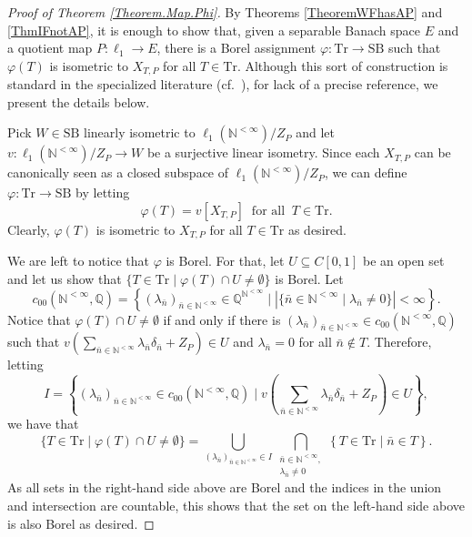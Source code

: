 \documentclass[letterpaper]{amsart}
\numberwithin{equation}{section}
\theoremstyle{definition}
\newcommand{\N}{{\mathbb{N}}}
\newcommand{\Q}{{\mathbb{Q}}}
\newcommand{\Tr}{\mathrm{Tr}}
\newcommand{\SB}{\mathrm{SB}}
\begin{document}
\begin{proof}
[Proof of Theorem \ref{Theorem.Map.Phi}]  By Theorems \ref{TheoremWFhasAP} and \ref{ThmIFnotAP}, it is enough to show that, given a separable Banach space  $E$ and a quotient map $P\colon \ell_1\to E$, there is a Borel assignment $\varphi\colon \Tr\to \SB$ such that $\varphi(T)$ is isometric to $X_{T,P}$ for all $T\in \Tr$. Although this sort of construction is standard in the specialized literature (cf.\ \cite[Lemma 2.4]{Bossard2002Fund}), for lack of a precise reference, we present the details below. 


Pick $W\in \SB$  linearly isometric to $\ell_1(\N^{<\infty})/Z_P$ and let $v\colon \ell_1(\N^{<\infty})/Z_P\to W$ be a surjective linear isometry. Since each $X_{T,P}$ can be canonically seen as a closed subspace of $\ell_1(\N^{<\infty})/Z_P$, we can define   $\varphi\colon \Tr\to \SB$ by letting  \[\varphi(T)=v\left[X_{T,P}\right] \ \text{ for all }\ T\in \Tr.\]
Clearly, $\varphi(T)$ is isometric to $X_{T,P}$ for all $T\in \Tr$ as desired. 

We are left to notice that $\varphi$ is Borel. For that, let $U\subseteq C[0,1]$ be an open set and let us show that 
$\{T\in \Tr\mid \varphi(T)\cap U\neq \emptyset\}$
is Borel. Let 
\[c_{00}(\N^{<\infty},\Q)=\left\{(\lambda_{\bar n})_{\bar n\in \N^{<\infty}}\in \Q^{\N^{<\infty}}\mid |\{\bar n\in \N^{<\infty}\mid \lambda_{\bar n}\neq 0\}|<\infty\right\}.\]
Notice that $\varphi(T)\cap U\neq \emptyset$ if and only if there is $(\lambda_{\bar n})_{\bar n\in \N^{<\infty}} \in c_{00}(\N^{<\infty},\Q)$ such that  $v(\sum_{\bar n\in \N^{<\infty}} \lambda_{\bar n}\delta_{\bar n}+Z_P)\in U$ and $\lambda_{\bar n}= 0$ for all $\bar n \not\in T$.   Therefore, letting 
\[I=\left\{(\lambda_{\bar n})_{\bar n\in \N^{<\infty}}\in c_{00}(\N^{<\infty},\Q)\mid v\left(\sum_{\bar n\in \N^{<\infty}} \lambda_{\bar n}\delta_{\bar n}+Z_P\right)\in U\right\},\]
we have that 
\[\{T\in \Tr\mid \varphi(T)\cap U\neq \emptyset\}=\bigcup_{(\lambda_{\bar n})_{\bar n\in \N^{<\infty}}\in I}\bigcap_{\substack{\bar n\in\N^{<\infty}, \\
\lambda_{\bar n}\neq 0}} \left\{T\in \Tr\mid \bar n\in T\right\}. \]
As all sets in the right-hand side above are Borel and the indices in the union and intersection are countable, this shows that  the set on the left-hand side above is also Borel as desired.
\end{proof}





 
\end{document}
